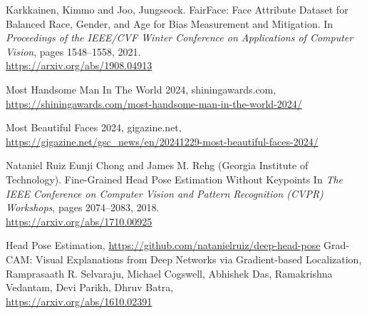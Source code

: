 \documentclass[a4paper,11pt,titlepage]{jsarticle}
\begin{document}
\begin{thebibliography}{9}
    Karkkainen, Kimmo and Joo, Jungseock.
    FairFace: Face Attribute Dataset for Balanced Race, Gender, and Age for Bias Measurement and Mitigation.
    In \textit{Proceedings of the IEEE/CVF Winter Conference on Applications of Computer Vision}, pages 1548--1558, 2021.\\
        \url{https://arxiv.org/abs/1908.04913}
    
    Most Handsome Man In The World 2024, shiningawards.com, \\
    \url{https://shiningawards.com/most-handsome-man-in-the-world-2024/}
    
    Most Beautiful Faces 2024, gigazine.net, \\ \url{https://gigazine.net/gsc_news/en/20241229-most-beautiful-faces-2024/}
    
        Nataniel Ruiz Eunji Chong and James M. Rehg (Georgia Institute of Technology).
        Fine-Grained Head Pose Estimation Without Keypoints
         In \textit{The IEEE Conference on Computer Vision and Pattern Recognition (CVPR) Workshops}, pages 2074--2083, 2018. \\
          \url{https://arxiv.org/abs/1710.00925}

    Head Pose Estimation, \url{https://github.com/natanielruiz/deep-head-pose}
    Grad-CAM: Visual Explanations from Deep Networks via Gradient-based Localization, 
    Ramprasaath R. Selvaraju, Michael Cogswell, Abhishek Das, Ramakrishna Vedantam, Devi Parikh, Dhruv Batra,\\
    \url{https://arxiv.org/abs/1610.02391}
    
\end{thebibliography}
\end{document}
